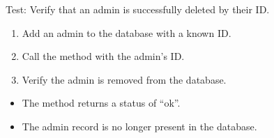\documentclass[letterpaper,10pt,english]{sphinxmanual}
\begin{document}
\begin{fulllineitems}
\label{\detokenize{test:test.test_admin.test_delete_admin_success}}
\pysigstartsignatures
\pysiglinewithargsret
{}
{}
{}
\pysigstopsignatures
\sphinxAtStartPar
Test: Verify that an admin is successfully deleted by their ID.
\begin{description}
\begin{enumerate}
%
\item {} 
\sphinxAtStartPar
Add an admin to the database with a known ID.

\item {} 
\sphinxAtStartPar
Call the  method with the admin’s ID.

\item {} 
\sphinxAtStartPar
Verify the admin is removed from the database.

\end{enumerate}

\begin{itemize}
\item {} 
\sphinxAtStartPar
The method returns a status of “ok”.

\item {} 
\sphinxAtStartPar
The admin record is no longer present in the database.

\end{itemize}

\end{description}

\end{fulllineitems}

\end{document}
